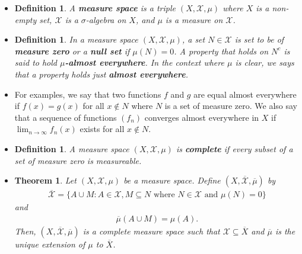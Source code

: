 \documentclass[10pt]{article}
\newtheorem{theorem}[lemma]{Theorem}
\newtheorem{definition}[lemma]{Definition}
\newcommand{\mcal}[1]{\mathcal{#1}}
\begin{document}
\begin{itemize}
  \item \begin{definition}
    A {\bf measure space} is a triple $(X, \mcal{X}, \mu)$ where $X$ is a non-empty set, $\mcal{X}$ is a $\sigma$-algebra on $X$, and $\mu$ is a measure on $\mcal{X}$.
  \end{definition}

  \item \begin{definition}
    In a measure space $(X, \mcal{X}, \mu)$, a set $N \in \mcal{X}$ is set to be of {\bf measure zero} or a {\bf null set} if $\mu(N) = 0$. A property that holds on $N^c$ is said to hold {\bf $\mu$-almost everywhere}. In the context where $\mu$ is clear, we says that a property holds just {\bf almost everywhere}.
  \end{definition}

  \item For examples, we say that two functions $f$ and $g$ are equal almost everywhere if $f(x) = g(x)$ for all $x \not\in N$ where $N$ is a set of measure zero. We also say that a sequence of functions $(f_n)$ converges almost everywhere in $X$ if $\lim_{n \rightarrow \infty} f_n(x)$ exists for all $x \not\in N$.
  
  \item \begin{definition}
    A measure space $(X, \mcal{X}, \mu)$ is {\bf complete} if every subset of a set of measure zero is measureable.
  \end{definition}

  \item \begin{theorem}
    Let $(X, \mcal{X}, \mu)$ be a measure space. Define $(X, \overline{\mcal{X}}, \overline{\mu})$ by
    \begin{align*}
      \overline{\mcal{X}} = \{ A \cup M : A \in \mcal{X}, M \subseteq N \mbox{ where } N \in \mcal{X} \mbox{ and } \mu(N) = 0 \}
    \end{align*}
    and 
    \begin{align*}
      \overline{\mu}(A \cup M) = \mu(A).
    \end{align*}
    Then, $(X, \overline{\mcal{X}}, \overline{\mu})$ is a complete measure space such that $\mcal{X} \subseteq \overline{X}$ and $\overline{\mu}$ is the unique extension of $\mu$ to $\overline{X}$.
  \end{theorem}


\end{itemize}
\end{document}
